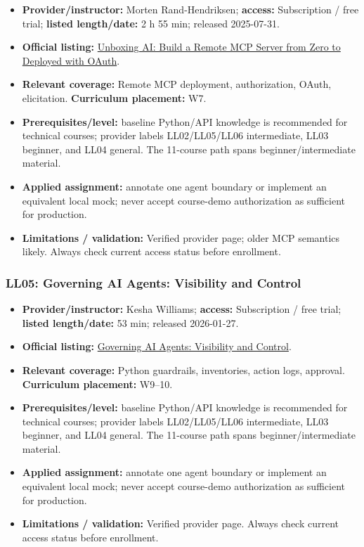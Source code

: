 \documentclass[
  10pt,
]{article}
\providecommand{\tightlist}{%
  \setlength{\itemsep}{0pt}\setlength{\parskip}{0pt}}
\begin{document}
\begin{itemize}
\tightlist
\item
  \textbf{Provider/instructor:} Morten Rand-Hendriksen; \textbf{access:}
  Subscription / free trial; \textbf{listed length/date:} 2 h 55 min;
  released 2025-07-31.
\item
  \textbf{Official listing:}
  \href{https://www.linkedin.com/learning/unboxing-ai-build-a-remote-mcp-server-from-zero-to-deployed-with-oauth}{Unboxing
  AI: Build a Remote MCP Server from Zero to Deployed with OAuth}.
\item
  \textbf{Relevant coverage:} Remote MCP deployment, authorization,
  OAuth, elicitation. \textbf{Curriculum placement:} W7.
\item
  \textbf{Prerequisites/level:} baseline Python/API knowledge is
  recommended for technical courses; provider labels LL02/LL05/LL06
  intermediate, LL03 beginner, and LL04 general. The 11-course path
  spans beginner/intermediate material.
\item
  \textbf{Applied assignment:} annotate one agent boundary or implement
  an equivalent local mock; never accept course-demo authorization as
  sufficient for production.
\item
  \textbf{Limitations / validation:} Verified provider page; older MCP
  semantics likely. Always check current access status before
  enrollment.
\end{itemize}

\subsubsection{LL05: Governing AI Agents: Visibility and
Control}\label{ll05-governing-ai-agents-visibility-and-control}

\begin{itemize}
\tightlist
\item
  \textbf{Provider/instructor:} Kesha Williams; \textbf{access:}
  Subscription / free trial; \textbf{listed length/date:} 53 min;
  released 2026-01-27.
\item
  \textbf{Official listing:}
  \href{https://www.linkedin.com/learning/governing-ai-agents-visibility-and-control}{Governing
  AI Agents: Visibility and Control}.
\item
  \textbf{Relevant coverage:} Python guardrails, inventories, action
  logs, approval. \textbf{Curriculum placement:} W9--10.
\item
  \textbf{Prerequisites/level:} baseline Python/API knowledge is
  recommended for technical courses; provider labels LL02/LL05/LL06
  intermediate, LL03 beginner, and LL04 general. The 11-course path
  spans beginner/intermediate material.
\item
  \textbf{Applied assignment:} annotate one agent boundary or implement
  an equivalent local mock; never accept course-demo authorization as
  sufficient for production.
\item
  \textbf{Limitations / validation:} Verified provider page. Always
  check current access status before enrollment.
\end{itemize}
\end{document}
